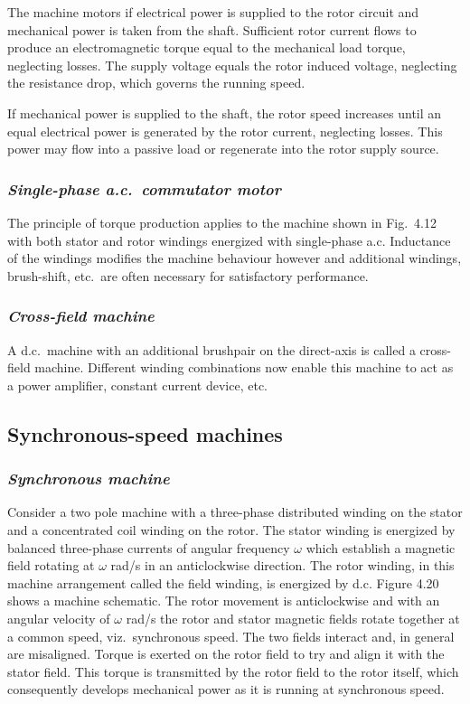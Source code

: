 \documentclass[a4paper,numbers=noenddot,12pt]{scrbook}
\begin{document}
            The machine motors if electrical power is supplied to the rotor circuit and mechanical power is taken from the shaft. Sufficient rotor current flows to produce an electromagnetic torque equal to the mechanical load torque, neglecting losses. The supply voltage equals the rotor induced voltage, neglecting the resistance drop, which governs the running speed. 

            If mechanical power is supplied to the shaft, the rotor speed increases until an equal electrical power is generated by the rotor current, neglecting losses. This power may flow into a passive load or regenerate into the rotor supply source. 

            \subsubsection{\textit{Single-phase a.c.\ commutator motor}}
            The principle of torque production applies to the machine shown in Fig.\ 4.12 with both stator and rotor windings energized with single-phase a.c. Inductance of the windings modifies the machine behaviour however and additional windings, brush-shift, etc.\ are often necessary for satisfactory performance. 

            \subsubsection{\textit{Cross-field machine}}
            A d.c.\ machine with an additional brush­pair on the direct-axis is called a cross-field machine. Different winding combinations now enable this machine to act as a power amplifier, constant current device, etc.

            \subsection{Synchronous-speed machines}
            \subsubsection{\textit{Synchronous machine}}
            Consider a two pole machine with a three-phase distributed winding on the stator and a concentrated coil winding on the rotor. The stator winding is energized by balanced three-phase currents of angular frequency $\omega$ which establish a magnetic field rotating at $\omega$ rad/s in an anticlockwise direction. The rotor winding, in this machine arrangement called the field winding, is energized by d.c. Figure 4.20 shows a machine schematic. The rotor
            movement is anticlockwise and with an angular velocity of $\omega$ rad/s the rotor and stator magnetic fields rotate together at a common speed, viz.\ synchronous speed. The two fields interact and, in general are misaligned. Torque is exerted on the rotor field to try and align it with the stator field. This torque is transmitted by the rotor field to the rotor itself, which consequently develops mechanical power as it is running at synchronous speed.
\end{document}
